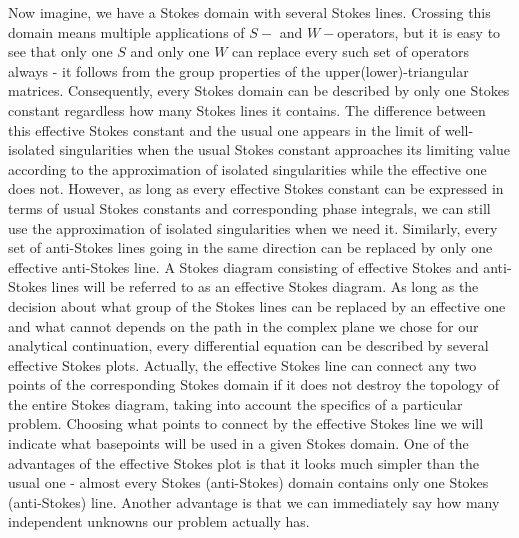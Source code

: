 \documentclass[aps,prl,preprint,superscriptaddress]{revtex4}
\begin{document}
Now imagine, we have a Stokes domain with several Stokes lines. Crossing this domain means multiple applications of $S-$ and $W-$operators, but it is easy to see that only one $S$ and only one $W$ can replace every such set of operators always - it follows from the group properties of the upper(lower)-triangular matrices. Consequently, every Stokes domain can be described by only one Stokes constant regardless how many Stokes lines it contains. The difference between this effective Stokes constant and the usual one appears in the limit of well-isolated singularities when the usual Stokes constant approaches its limiting value according to the approximation of isolated singularities while the effective one does not. However, as long as every effective Stokes constant can be expressed in terms of usual Stokes constants and corresponding phase integrals, we can still use the approximation of isolated singularities when we need it. Similarly, every set of anti-Stokes lines going in the same direction can be replaced by only one effective anti-Stokes line. A Stokes diagram consisting of effective Stokes and anti-Stokes lines will be referred to as an effective Stokes diagram. As long as the decision about what group of the Stokes lines can be replaced by an effective one and what cannot depends on the path in the complex plane we chose for our analytical continuation, every differential equation can be described by several effective Stokes plots. Actually, the effective Stokes line can connect any two points of the corresponding Stokes domain if it does not destroy the topology of the entire Stokes diagram, taking into account the specifics of a particular problem. Choosing what points to connect by the effective Stokes line we will indicate what basepoints will be used in a given Stokes domain. One of the advantages of the effective Stokes plot is that it looks much simpler than the usual one - almost every Stokes (anti-Stokes) domain contains only one Stokes (anti-Stokes) line. Another advantage is that we can immediately say how many independent unknowns our problem actually has. 
\end{document}
